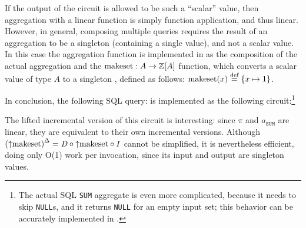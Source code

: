 If the output of the \dbsp circuit is allowed to be such a ``scalar'' value, then aggregation
with a linear function is simply function application, and thus linear.
However, in general, composing multiple queries
requires the result of an aggregation to be a singleton \zr (containing a single value),
and not a scalar value.  In this case the aggregation function is implemented in
\dbsp as the composition of the actual aggregation and the
$\mbox{makeset}: A \to \mathbb{Z}[A]$ function,
which converts a scalar value of type $A$ to a singleton \zr, defined as follows:
$\mbox{makeset}(x) \stackrel{\textrm{\scriptsize def}}{=} \{ x \mapsto 1 \}$.

In conclusion, the following SQL query:
is implemented as the following circuit:\footnote{The actual SQL \texttt{SUM} aggregate is
even more complicated, because it needs to skip \texttt{NULL}s,
and it returns \texttt{NULL} for an empty input set;
this behavior can be accurately implemented in \dbsp.}


The lifted incremental version of this circuit is interesting: since $\pi$
and $a_\texttt{SUM}$ are linear, they are equivalent to their own incremental
versions.  Although ${({\uparrow}\mbox{makeset})}^{\Delta} = \mathit{D} \circ {\uparrow}\mbox{makeset} \circ \mathit{I}$
cannot be simplified, it is nevertheless efficient, doing only O(1) work per
invocation, since its input and output are singleton values.


%

